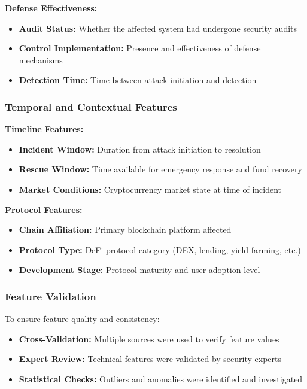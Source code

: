 \textbf{Defense Effectiveness:}
\begin{itemize}
    \item \textbf{Audit Status:} Whether the affected system had undergone security audits
    \item \textbf{Control Implementation:} Presence and effectiveness of defense mechanisms
    \item \textbf{Detection Time:} Time between attack initiation and detection
\end{itemize}

\subsubsection{Temporal and Contextual Features}
\textbf{Timeline Features:}
\begin{itemize}
    \item \textbf{Incident Window:} Duration from attack initiation to resolution
    \item \textbf{Rescue Window:} Time available for emergency response and fund recovery
    \item \textbf{Market Conditions:} Cryptocurrency market state at time of incident
\end{itemize}

\textbf{Protocol Features:}
\begin{itemize}
    \item \textbf{Chain Affiliation:} Primary blockchain platform affected
    \item \textbf{Protocol Type:} DeFi protocol category (DEX, lending, yield farming, etc.)
    \item \textbf{Development Stage:} Protocol maturity and user adoption level
\end{itemize}

\subsubsection{Feature Validation}
To ensure feature quality and consistency:
\begin{itemize}
    \item \textbf{Cross-Validation:} Multiple sources were used to verify feature values
    \item \textbf{Expert Review:} Technical features were validated by security experts
    \item \textbf{Statistical Checks:} Outliers and anomalies were identified and investigated
\end{itemize}



